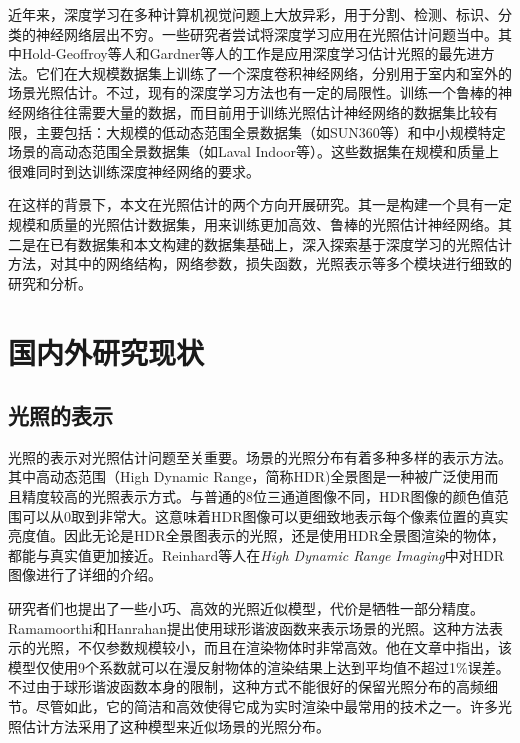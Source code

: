 近年来，深度学习在多种计算机视觉问题上大放异彩，用于分割、检测、标识、分类的神经网络层出不穷。一些研究者尝试将深度学习应用在光照估计问题当中。其中Hold-Geoffroy等人\cite{hold2017deep}和Gardner等人\cite{gardner2017learning}的工作是应用深度学习估计光照的最先进方法。它们在大规模数据集上训练了一个深度卷积神经网络，分别用于室内和室外的场景光照估计。不过，现有的深度学习方法也有一定的局限性。训练一个鲁棒的神经网络往往需要大量的数据，而目前用于训练光照估计神经网络的数据集比较有限，主要包括：大规模的低动态范围全景数据集（如SUN360\cite{xiao2012recognizing}等）和中小规模特定场景的高动态范围全景数据集（如Laval Indoor等\cite{gardner2017learning}）。这些数据集在规模和质量上很难同时到达训练深度神经网络的要求。

在这样的背景下，本文在光照估计的两个方向开展研究。其一是构建一个具有一定规模和质量的光照估计数据集，用来训练更加高效、鲁棒的光照估计神经网络。其二是在已有数据集和本文构建的数据集基础上，深入探索基于深度学习的光照估计方法，对其中的网络结构，网络参数，损失函数，光照表示等多个模块进行细致的研究和分析。

\section{国内外研究现状}
\subsection{光照的表示}
光照的表示对光照估计问题至关重要。场景的光照分布有着多种多样的表示方法。其中高动态范围（High Dynamic Range，简称HDR)全景图是一种被广泛使用而且精度较高的光照表示方式。与普通的8位三通道图像不同，HDR图像的颜色值范围可以从0取到非常大。这意味着HDR图像可以更细致地表示每个像素位置的真实亮度值。因此无论是HDR全景图表示的光照，还是使用HDR全景图渲染的物体，都能与真实值更加接近。Reinhard等人在\textit{High Dynamic Range Imaging}\cite{reinhard2005high}中对HDR图像进行了详细的介绍。

研究者们也提出了一些小巧、高效的光照近似模型，代价是牺牲一部分精度。Ramamoorthi和Hanrahan\cite{ramamoorthi2001efficient}提出使用球形谐波函数来表示场景的光照。这种方法表示的光照，不仅参数规模较小，而且在渲染物体时非常高效。他在文章中指出，该模型仅使用9个系数就可以在漫反射物体的渲染结果上达到平均值不超过1\%误差。不过由于球形谐波函数本身的限制，这种方式不能很好的保留光照分布的高频细节。尽管如此，它的简洁和高效使得它成为实时渲染中最常用的技术之一\cite{green2003spherical,sloan2008stupid}。许多光照估计方法采用了这种模型来近似场景的光照分布。

